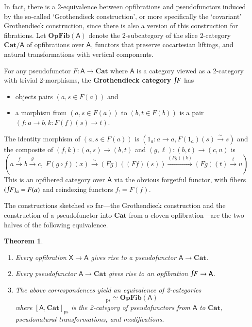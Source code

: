 \documentclass[a4paper,onecolumn, superscriptaddress,10pt, accepted=2022-03-25, issue=SS, volume=VV, shorttitle=papers/compositionality-VV-SS]{compositionalityarticle}
\let\maps\colon
\newtheorem{thm}{Theorem}[section]
\newcommand{\A}{\mathsf{A}}
\newcommand{\X}{\mathsf{X}}
\newcommand{\bicat}{\mathbf}
\newcommand{\Cat}{\bicat{Cat}}
\newcommand{\OpFib}{\bicat{OpFib}}
\newcommand{\inta}{\raisebox{.3\depth}{$\smallint\hspace{-.01in}$}}
\newcommand{\pse}{\mathrm{ps}}
\begin{document}
In fact, there is a 2-equivalence between opfibrations and pseudofunctors induced by the so-called `Grothendieck construction', or more specifically the `covariant'  Grothendieck construction, since there is also a version of this construction for fibrations.  Let $\OpFib(\A)$ denote the 2-subcategory of the slice 2-category $\Cat/ \A$ of opfibrations over $\A$, functors that 
preserve cocartesian liftings, and natural transformations with vertical components.  
\begin{defn}\label{def:GrothCat}
For any pseudofunctor $F\maps\A\to\Cat$ where $\A$ is a category viewed as a 2-category with trivial 2-morphisms, the \textbf{Grothendieck category}
$\inta F$ has
\begin{itemize}
\item objects pairs $(a, s \in F(a))$ and
\item a morphism from $(a, s \in F(a))$ to $(b, t\in F(b))$ is a pair $(f \maps a \to b,k \maps F(f)(s) \to t)$.
\end{itemize}
The identity morphism of $(a, s\in F(a))$ is $(1_a\maps a\to a,F(1_a)(s)\xrightarrow{\sim} s)$ and the composite of $(f,k) \maps (a,s) \to (b,t)$ and $(g,\ell) \maps (b,t) \to (c,u)$ is
\[
\left(a\xrightarrow{f}b\xrightarrow{g}c, \; F(g\circ f)(x)\xrightarrow{\sim} (Fg)((Ff)(s))\xrightarrow{(Fg)(k)}(Fg)(t)\xrightarrow{\ell}u\right) 
\]
This is an opfibered category over $\A$ via the obvious forgetful functor, with fibers $(\inta F)_a=F(a)$ and reindexing functors $f_!=F(f)$.
\end{defn}
The constructions sketched so far---the Grothendieck construction and the construction of a pseudofunctor into $\Cat$ from a cloven opfibration---are the two halves of the following equivalence.

\begin{thm}\label{thm:Grothendieck}\hfill
\begin{enumerate}
\item Every opfibration $\X \to \A$ gives rise to a pseudofunctor $\A \to \Cat$.
\item Every pseudofunctor $\A \to \Cat$ gives rise to an opfibration $\inta F \to\A$.
\item The above correspondences yield an equivalence of 2-categories 
\begin{displaymath}
[\A,\Cat]_\pse \simeq \OpFib(\A)
\end{displaymath}
where $[\A,\Cat]_\pse$ is the 2-category of pseudofunctors from $\A$ to $\Cat$, pseudonatural transformations, and modifications.
\end{enumerate}
\end{thm}
\end{document}

